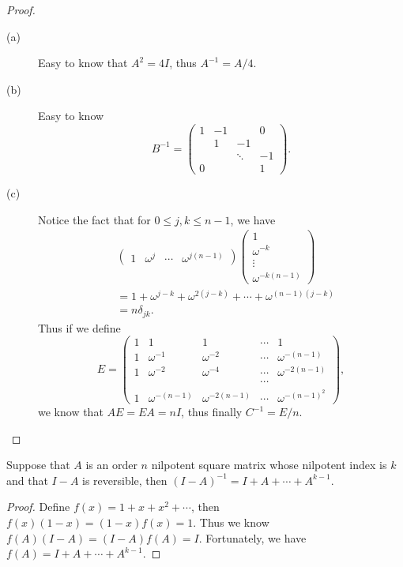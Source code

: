 \begin{proof}
	\begin{description}
	\item[(a)]
	Easy to know that $A^2=4I$, thus $A^{-1}=A/4$.
	\item[(b)] 
	Easy to know
	\[B^{-1}=\begin{pmatrix}1&-1& &0\\ &1&-1& \\ & &\ddots&-1\\
	0& & &1\end{pmatrix}.\]
	\item[(c)] 
	Notice the fact that for $0\leq j,k\leq n-1$, we have
	\begin{align*}
	&\begin{pmatrix}1&\omega^j&\cdots&\omega^{j(n-1)}\end{pmatrix}
	\begin{pmatrix}1\\\omega^{-k}\\\vdots\\\omega^{-k(n-1)}\end{pmatrix}\\
	&= 1+\omega^{j-k}+\omega^{2(j-k)}+\cdots+\omega^{(n-1)(j-k)}\\
	&=n\delta_{jk}.
	\end{align*}
	Thus if we define
	\[E=\begin{pmatrix}1&1&1&\cdots&1\\1&\omega^{-1}&\omega^{-2}&\cdots&\omega^{-(n-1)}\\
		1&\omega^{-2}&\omega^{-4}&\cdots&\omega^{-2(n-1)}\\& & &\cdots&\\
		1&\omega^{-(n-1)}&\omega^{-2(n-1)}&\cdots&\omega^{-(n-1)^2}\end{pmatrix},\]
	we know that $AE=EA=nI$, thus finally $C^{-1}=E/n$.
	\end{description}
\end{proof}

\begin{pro}%
	Suppose that $A$ is an order $n$ nilpotent square matrix whose nilpotent index is $k$ and that $I-A$ is reversible, then $(I-A)^{-1}=I+A+\cdots+A^{k-1}$.
\end{pro}
\begin{proof}
	Define $f(x)=1+x+x^2+\cdots$, then $f(x)(1-x)=(1-x)f(x)=1$. Thus we know $f(A)(I-A)=(I-A)f(A)=I$. Fortunately, we have $f(A)=I+A+\cdots+A^{k-1}$.
\end{proof}

